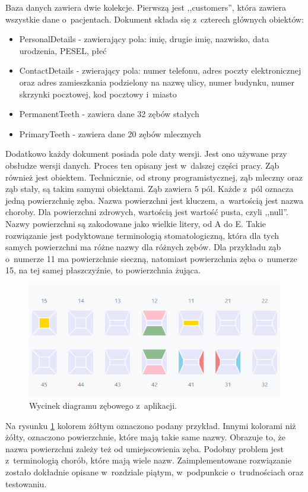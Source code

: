 Baza danych zawiera dwie kolekcje. Pierwszą jest ,,customers'', która zawiera wszystkie dane o~pacjentach. Dokument składa się z~czterech głównych obiektów:
    \begin{itemize}
        \item PersonalDetails - zawierający pola: imię, drugie imię, nazwisko, data urodzenia, PESEL, płeć
        \item ContactDetails - zwierający pola: numer telefonu, adres poczty elektronicznej oraz adres zamieszkania podzielony na nazwę ulicy, numer budynku, numer skrzynki pocztowej, kod pocztowy i~miasto 
        \item PermanentTeeth - zawiera dane 32 zębów stałych
        \item PrimaryTeeth - zawiera dane 20 zębów mlecznych
    \end{itemize}
Dodatkowo każdy dokument posiada pole daty wersji. Jest ono używane przy obsłudze wersji danych. Proces ten opisany jest w~dalszej części pracy. 
Ząb również jest obiektem. Technicznie, od strony programistycznej, ząb mleczny oraz ząb stały, są takim samymi obiektami. Ząb zawiera 5 pól. Każde z~pól oznacza jedną powierzchnię zęba. Nazwa powierzchni jest kluczem, a~wartością jest nazwa choroby. Dla powierzchni zdrowych, wartością jest wartość pusta, czyli ,,null''. Nazwy powierzchni są zakodowane jako wielkie litery, od A do E. Takie rozwiązanie jest podyktowane terminologią stomatologiczną, która dla tych samych powierzchni ma różne nazwy dla różnych zębów. Dla przykładu ząb o~numerze 11 ma powierzchnie sieczną, natomiast powierzchnia zęba o~numerze 15, na tej samej płaszczyźnie, to powierzchnia żująca. 
\begin{figure}[ht!]
\centering\includegraphics[width=145mm,scale=1.5]{figures/zeby.PNG}
\caption{Wycinek diagramu zębowego z~aplikacji.}
\label{fig:zeby}
\end{figure}
Na rysunku \ref{fig:zeby} kolorem żółtym oznaczono podany przykład. Innymi kolorami niż żółty, oznaczono powierzchnie, które mają takie same nazwy. Obrazuje to, że nazwa powierzchni zależy też od umiejscowienia zęba. Podobny problem jest z~terminologią chorób, które mają wiele nazw. Zaimplementowane rozwiązanie zostało dokładnie opisane w~rozdziale piątym, w~podpunkcie o~trudnościach oraz testowaniu.

